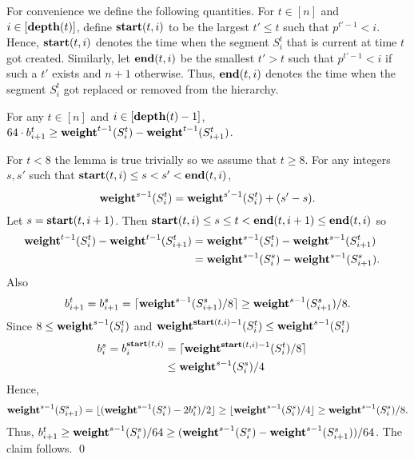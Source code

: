 \documentclass[runningheads,a4paper]{llncs}
\newcommand{\weight}{{\rm {\bf weight}}}
\newcommand{\depth}{{\rm {\bf depth}}}
\newcommand{\starts}{{\rm {\bf start}}}
\newcommand{\sends}{{\rm {\bf end}}}
\renewenvironment{proof}{\noindent{\it Proof. }} {{\qed}}
\begin{document}
For convenience we define the following quantities.
For $t\in[n]$ and $i\in[\depth(t)]$, define $\starts(t,i)$ to be the largest $t' \le t$ 
such that $p^{t'-1} < i$. Hence, $\starts(t,i)$ denotes the time when the segment $S^t_i$ that is current at time $t$ got created.
Similarly, let $\sends(t,i)$ be the smallest $t'>t$ such that $p^{t'-1} < i$ if such a $t'$ exists and $n+1$ otherwise.
Thus, $\sends(t,i)$ denotes the time when the segment $S^t_i$ got replaced or removed from the hierarchy. 

%


\begin{lemma}\label{l-p1}
For any $t\in[n]$ and $i\in[\depth(t)-1]$, $64\cdot b^t_{i+1} \ge \weight^{t-1}(S^t_i) - \weight^{t-1}(S^t_{i+1})$.
\end{lemma}

\begin{proof}  %
For $t<8$ the lemma is true trivially so we assume that $t\ge 8$.
For any integers $s,s'$ such that $\starts(t,i) \le s < s' < \sends(t,i)$, 
\begin{align*}
\weight^{s-1}(S^t_i) = \weight^{s'-1}(S^t_i) + (s'-s).
\end{align*}
Let $s=\starts(t,i+1)$. Then $\starts(t,i) \le s \le t <  \sends(t,i+1) \le \sends(t,i)$ so
\begin{align*}
\weight^{t-1}(S^t_i) - \weight^{t-1}(S^t_{i+1}) &= \weight^{s-1}(S^t_i) - \weight^{s-1}(S^t_{i+1}) \cr 
&= \weight^{s-1}(S^s_i) - \weight^{s-1}(S^s_{i+1}).
\end{align*}
Also
\begin{align*}
b^t_{i+1} = b^s_{i+1} = \lceil \weight^{s-1}(S^s_{i+1})/8\rceil \ge  \weight^{s-1}(S^s_{i+1})/8.
\end{align*}
Since $8 \le \weight^{s-1}(S^t_{i})$ and $\weight^{\starts(t,i)-1}(S^t_{i}) \le \weight^{s-1}(S^t_{i}) $
\begin{align*}
b^s_{i} = b^{\starts(t,i)}_{i} &= \lceil \weight^{\starts(t,i)-1}(S^t_{i})/8 \rceil \cr
&\le \weight^{s-1}(S^s_{i})/4 
\end{align*}
Hence,
\begin{align*}
\weight^{s-1}(S^s_{i+1}) = \lfloor  (\weight^{s-1}(S^s_{i}) - 2b^s_i )/ 2 \rfloor \ge \lfloor \weight^{s-1}(S^s_{i})/4 \rfloor \ge \weight^{s-1}(S^s_{i})/8.
\end{align*}
Thus, $b^t_{i+1} \ge \weight^{s-1}(S^s_{i})/64 \ge (\weight^{s-1}(S^s_i) - \weight^{s-1}(S^s_{i+1}))/64$. The claim follows.
\end{proof}
\end{document}
